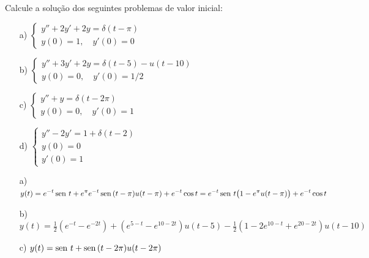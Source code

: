 \begin{exer}
Calcule a solução dos seguintes problemas de valor inicial:
\begin{itemize}
  \item[a)] $\displaystyle \left\{
                              \begin{array}{ll}
                                y'' + 2y'+2y = \delta(t-\pi)\\
                                y(0) = 1, \quad y'(0)=0
                              \end{array}
                            \right.
  $
  \item[b)] $\displaystyle \left\{
                              \begin{array}{ll}
                                y'' + 3y'+2y = \delta(t-5) - u(t-10)\\
                                y(0) = 0, \quad y'(0)=1/2
                                \end{array}
                            \right.
  $
  \item[c)] $\displaystyle \left\{
                              \begin{array}{ll}
                                y'' + y = \delta(t-2\pi)\\
                                y(0) = 0, \quad y'(0)=1
                              \end{array}
                            \right.
  $
  \item[d)] $ \displaystyle \left\{\begin{array}{l}
   y''-2y'=1+\delta(t-2)\\
   y(0)=0\\
   y'(0)=1
  \end{array}\right.
 $
  
\end{itemize}
\end{exer}
\begin{resp}
\begin{itemize}
  \item[a)] $\displaystyle y(t) = e^{-t} \operatorname{sen}\, t + e^\pi e^{-t} \operatorname{sen}\, (t-\pi) u (t-\pi)  + e^{-t} \cos t  = e^{-t} \operatorname{sen}\, t \big( 1 - e^\pi u (t-\pi) \big)  + e^{-t} \cos t$
  \item[b)] $\displaystyle y(t) = \frac{1}{2} ( e^{-t} - e^{-2t} ) +  ( e^{5-t} - e^{10-2t} )u(t-5) - \frac{1}{2} (1 - 2e^{10-t} + e^{20-2t} )u(t-10)$
  \item[c)] $\displaystyle y(t) = \operatorname{sen}\, t + \operatorname{sen}\,(t-2\pi) u(t-2\pi)$
\end{itemize}
\end{resp}

